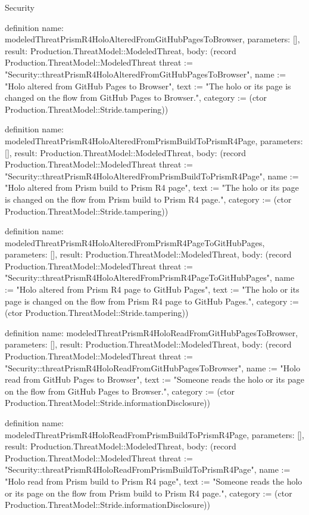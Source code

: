 \begin{lexlean}{Security}
\begin{semanticmodule}
definition{
  name: modeledThreatPrismR4HoloAlteredFromGitHubPagesToBrowser,
  parameters: [],
  result: Production.ThreatModel::ModeledThreat,
  body: (record Production.ThreatModel::ModeledThreat {threat := "Security::threatPrismR4HoloAlteredFromGitHubPagesToBrowser", name := "Holo altered from GitHub Pages to Browser", text := "The holo or its page is changed on the flow from GitHub Pages to Browser.", category := (ctor Production.ThreatModel::Stride.tampering)})
}

definition{
  name: modeledThreatPrismR4HoloAlteredFromPrismBuildToPrismR4Page,
  parameters: [],
  result: Production.ThreatModel::ModeledThreat,
  body: (record Production.ThreatModel::ModeledThreat {threat := "Security::threatPrismR4HoloAlteredFromPrismBuildToPrismR4Page", name := "Holo altered from Prism build to Prism R4 page", text := "The holo or its page is changed on the flow from Prism build to Prism R4 page.", category := (ctor Production.ThreatModel::Stride.tampering)})
}

definition{
  name: modeledThreatPrismR4HoloAlteredFromPrismR4PageToGitHubPages,
  parameters: [],
  result: Production.ThreatModel::ModeledThreat,
  body: (record Production.ThreatModel::ModeledThreat {threat := "Security::threatPrismR4HoloAlteredFromPrismR4PageToGitHubPages", name := "Holo altered from Prism R4 page to GitHub Pages", text := "The holo or its page is changed on the flow from Prism R4 page to GitHub Pages.", category := (ctor Production.ThreatModel::Stride.tampering)})
}

definition{
  name: modeledThreatPrismR4HoloReadFromGitHubPagesToBrowser,
  parameters: [],
  result: Production.ThreatModel::ModeledThreat,
  body: (record Production.ThreatModel::ModeledThreat {threat := "Security::threatPrismR4HoloReadFromGitHubPagesToBrowser", name := "Holo read from GitHub Pages to Browser", text := "Someone reads the holo or its page on the flow from GitHub Pages to Browser.", category := (ctor Production.ThreatModel::Stride.informationDisclosure)})
}

definition{
  name: modeledThreatPrismR4HoloReadFromPrismBuildToPrismR4Page,
  parameters: [],
  result: Production.ThreatModel::ModeledThreat,
  body: (record Production.ThreatModel::ModeledThreat {threat := "Security::threatPrismR4HoloReadFromPrismBuildToPrismR4Page", name := "Holo read from Prism build to Prism R4 page", text := "Someone reads the holo or its page on the flow from Prism build to Prism R4 page.", category := (ctor Production.ThreatModel::Stride.informationDisclosure)})
}


\end{semanticmodule}
\end{lexlean}
